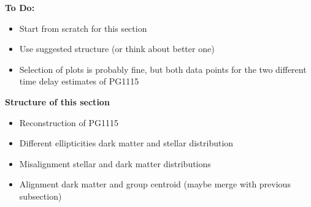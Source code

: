 \documentclass[useAMS,usenatbib]{mn2e}
\begin{document}
\textbf{To Do:}
\begin{itemize}
\item Start from scratch for this section
\item Use suggested structure (or think about better one)
\item Selection of plots is probably fine, but both data points for the two different time delay estimates of PG1115
\end{itemize}

\textbf{Structure of this section}
\begin{itemize}
\item Reconstruction of PG1115
\item Different ellipticities dark matter and stellar distribution
\item Misalignment stellar and dark matter distributions
\item Alignment dark matter and group centroid (maybe merge with previous subsection)
\end{itemize}
\end{document}
